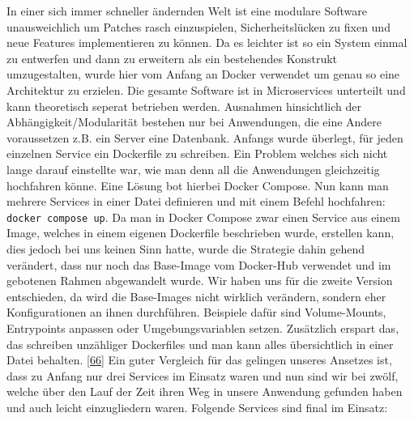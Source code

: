 \documentclass[
    headings=optiontotocandhead,%
    twoside,
    numbers=noenddot,%
    12pt, %
    titlepage, %
    parskip=full, %
    listof=leveldown, 
    numbers=noenddot, %
    a4paper,DIV=14,
    BCOR=15mm,
]{scrbook}
\newcommand{\passthrough}[1]{#1}
\begin{document}
In einer sich immer schneller ändernden Welt ist eine modulare Software
unausweichlich um Patches rasch einzuspielen, Sicherheitslücken zu fixen
und neue Features implementieren zu können. Da es leichter ist so ein
System einmal zu entwerfen und dann zu erweitern als ein bestehendes
Konstrukt umzugestalten, wurde hier vom Anfang an Docker verwendet um
genau so eine Architektur zu erzielen. Die gesamte Software ist in
Microservices unterteilt und kann theoretisch seperat betrieben werden.
Ausnahmen hinsichtlich der Abhängigkeit/Modularität bestehen nur bei
Anwendungen, die eine Andere voraussetzen z.B. ein Server eine
Datenbank. Anfangs wurde überlegt, für jeden einzelnen Service ein
Dockerfile zu schreiben. Ein Problem welches sich nicht lange darauf
einstellte war, wie man denn all die Anwendungen gleichzeitig hochfahren
könne. Eine Lösung bot hierbei Docker Compose. Nun kann man mehrere
Services in einer Datei definieren und mit einem Befehl hochfahren:
\passthrough{\lstinline!docker compose up!}. Da man in Docker Compose
zwar einen Service aus einem Image, welches in einem eigenen Dockerfile
beschrieben wurde, erstellen kann, dies jedoch bei uns keinen Sinn
hatte, wurde die Strategie dahin gehend verändert, dass nur noch das
Base-Image vom Docker-Hub verwendet und im gebotenen Rahmen abgewandelt
wurde. Wir haben uns für die zweite Version entschieden, da wird die
Base-Images nicht wirklich verändern, sondern eher Konfigurationen an
ihnen durchführen. Beispiele dafür sind Volume-Mounts, Entrypoints
anpassen oder Umgebungsvariablen setzen. Zusätzlich erspart das, das
schreiben unzähliger Dockerfiles und man kann alles übersichtlich in
einer Datei behalten.
{[}\protect\hyperlink{ref-gpt-server-structure}{66}{]} Ein guter
Vergleich für das gelingen unseres Ansetzes ist, dass zu Anfang nur drei
Services im Einsatz waren und nun sind wir bei zwölf, welche über den
Lauf der Zeit ihren Weg in unsere Anwendung gefunden haben und auch
leicht einzugliedern waren. Folgende Services sind final im Einsatz:
\end{document}
